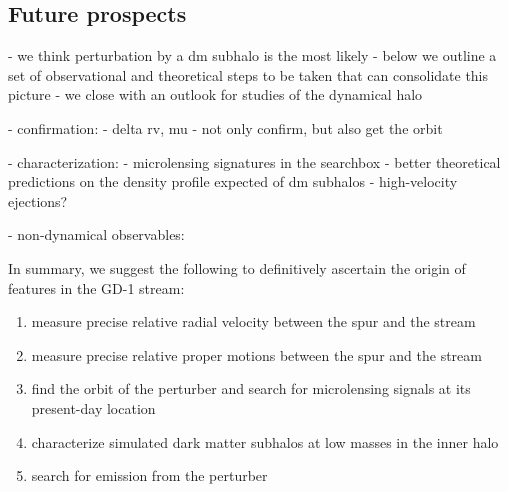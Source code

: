 \documentclass[twocolumn]{aastex62}
\newcommand{\acronym}[1]{{\small{#1}}}
\newcommand{\lcdm}{\acronym{$\Lambda$CDM}}
\begin{document}



\subsection{Future prospects}
\label{sec:future}
- we think perturbation by a dm subhalo is the most likely
- below we outline a set of observational and theoretical steps to be taken that can consolidate this picture
- we close with an outlook for studies of the dynamical halo

- confirmation:
- delta rv, mu
- not only confirm, but also get the orbit

- characterization:
- microlensing signatures in the searchbox
- better theoretical predictions on the density profile expected of dm subhalos
- high-velocity ejections?

- non-dynamical observables:

In summary, we suggest the following to definitively ascertain the origin of features in the GD-1 stream:
\begin{enumerate}
 \item measure precise relative radial velocity between the spur and the stream
 \item measure precise relative proper motions between the spur and the stream
 \item find the orbit of the perturber and search for microlensing signals at its present-day location
 \item characterize simulated dark matter subhalos at low masses in the inner halo
 \item search for emission from the perturber
\end{enumerate}
\end{document}
